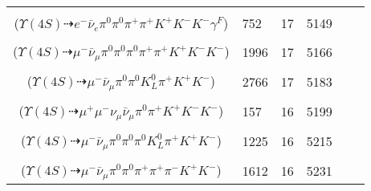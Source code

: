 \documentclass[landscape]{article}
\newcounter{rownumbers}
\newcommand\rn{\stepcounter{rownumbers}\arabic{rownumbers}}
\newcommand{\EOL}{\\} %
\newcommand{\topoTags}[1]{#1} %
\begin{document}
\begin{longtable}{clcccc}
\rn & \makecell[l]{ $ 
\Upsilon(4S) \rightarrow B^{0} \bar{B}^{0} ,
B^{0} \rightarrow \pi^{0} K^{+} K^{-} ,
\bar{B}^{0} \rightarrow e^{-} \bar{\nu}_{e} D^{*+} \gamma^{F} ,
D^{*+} \rightarrow \pi^{0} D^{+} ,
D^{+} \rightarrow \pi^{+} \pi^{+} K^{-} 
$ \\ ($
\Upsilon(4S) \dashrightarrow e^{-} \bar{\nu}_{e} \pi^{0} \pi^{0} \pi^{+} \pi^{+} K^{+} K^{-} K^{-} \gamma^{F} 
$) } & \topoTags{752 & }17 & 5149 \EOL

\rn & \makecell[l]{ $ 
\Upsilon(4S) \rightarrow B^{0} \bar{B}^{0} ,
B^{0} \rightarrow \pi^{0} K^{+} K^{-} ,
\bar{B}^{0} \rightarrow \mu^{-} \bar{\nu}_{\mu} D^{*+} ,
D^{*+} \rightarrow \pi^{+} D^{0} ,
D^{0} \rightarrow \pi^{0} \pi^{0} \pi^{+} K^{-} 
$ \\ ($
\Upsilon(4S) \dashrightarrow \mu^{-} \bar{\nu}_{\mu} \pi^{0} \pi^{0} \pi^{0} \pi^{+} \pi^{+} K^{+} K^{-} K^{-} 
$) } & \topoTags{1996 & }17 & 5166 \EOL

\rn & \makecell[l]{ $ 
\Upsilon(4S) \rightarrow B^{0} \bar{B}^{0} ,
B^{0} \rightarrow \pi^{0} K^{+} K^{-} ,
\bar{B}^{0} \rightarrow \mu^{-} \bar{\nu}_{\mu} D^{+} ,
D^{+} \rightarrow \pi^{0} K_{L}^{0} \pi^{+} 
$ \\ ($
\Upsilon(4S) \dashrightarrow \mu^{-} \bar{\nu}_{\mu} \pi^{0} \pi^{0} K_{L}^{0} \pi^{+} K^{+} K^{-} 
$) } & \topoTags{2766 & }17 & 5183 \EOL

\rn & \makecell[l]{ $ 
\Upsilon(4S) \rightarrow B^{0} \bar{B}^{0} ,
B^{0} \rightarrow \pi^{0} K^{+} K^{-} ,
\bar{B}^{0} \rightarrow \mu^{-} \bar{\nu}_{\mu} D^{*+} ,
D^{*+} \rightarrow \pi^{+} D^{0} ,
D^{0} \rightarrow \mu^{+} \nu_{\mu} K^{-} 
$ \\ ($
\Upsilon(4S) \dashrightarrow \mu^{+} \mu^{-} \nu_{\mu} \bar{\nu}_{\mu} \pi^{0} \pi^{+} K^{+} K^{-} K^{-} 
$) } & \topoTags{157 & }16 & 5199 \EOL

\rn & \makecell[l]{ $ 
\Upsilon(4S) \rightarrow B^{0} \bar{B}^{0} ,
B^{0} \rightarrow \pi^{0} K^{+} K^{-} ,
\bar{B}^{0} \rightarrow \mu^{-} \bar{\nu}_{\mu} D^{*+} ,
D^{*+} \rightarrow \pi^{0} D^{+} ,
D^{+} \rightarrow \pi^{0} K_{L}^{0} \pi^{+} 
$ \\ ($
\Upsilon(4S) \dashrightarrow \mu^{-} \bar{\nu}_{\mu} \pi^{0} \pi^{0} \pi^{0} K_{L}^{0} \pi^{+} K^{+} K^{-} 
$) } & \topoTags{1225 & }16 & 5215 \EOL

\rn & \makecell[l]{ $ 
\Upsilon(4S) \rightarrow B^{0} \bar{B}^{0} ,
B^{0} \rightarrow \pi^{0} K^{+} K^{-} ,
\bar{B}^{0} \rightarrow \mu^{-} \bar{\nu}_{\mu} D^{+} ,
D^{+} \rightarrow \pi^{0} \pi^{+} K_{S}^{0} ,
K_{S}^{0} \rightarrow \pi^{+} \pi^{-} 
$ \\ ($
\Upsilon(4S) \dashrightarrow \mu^{-} \bar{\nu}_{\mu} \pi^{0} \pi^{0} \pi^{+} \pi^{+} \pi^{-} K^{+} K^{-} 
$) } & \topoTags{1612 & }16 & 5231 \EOL


\end{longtable}
\end{document}

